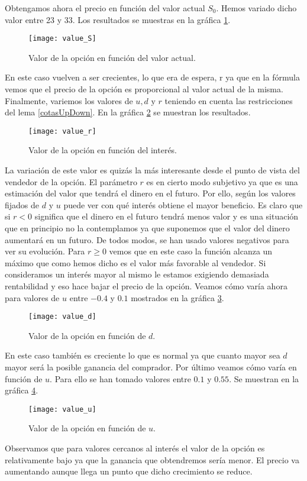 Obtengamos ahora el precio en función del valor actual $ S_0 $. Hemos variado dicho valor entre 23 y 33. Los resultados se muestras en la gráfica \ref{valueS}. 

\begin{figure}[h!]
	\centering
	\texttt{[image: value\_S]}
	\caption{Valor de la opción en función del valor actual.}
	\label{valueS}
\end{figure}
En este caso vuelven a ser crecientes, lo que era de espera, r ya que en la fórmula vemos que el precio de la opción es proporcional al valor actual de la misma. Finalmente, variemos los valores de  $ u, d \text{ y } r$ teniendo en cuenta las restricciones del lema \ref{cotasUpDown}. En la gráfica \ref{valuer} se muestran los resultados.
\begin{figure}[h!]
	\centering
	\texttt{[image: value\_r]}
	\caption{Valor de la opción en función del interés.}
	\label{valuer}
\end{figure}
La variación de este valor es quizás la más interesante desde el punto de vista del vendedor de la opción. El parámetro $ r $ es en cierto modo subjetivo ya que es una estimación del valor que tendrá el dinero en el futuro. Por ello, según los valores fijados de $ d $ y $ u $ puede ver con qué interés obtiene el mayor beneficio. Es claro que si $ r < 0 $ significa que el dinero en el futuro tendrá menos valor y es una situación que en principio no la contemplamos ya que suponemos que el valor del dinero aumentará en un futuro. De todos modos, se han usado valores negativos para ver su evolución. Para $ r \geq 0 $ vemos que en este caso la función alcanza un máximo que como hemos dicho es el valor más favorable al vendedor. Si consideramos un interés mayor al mismo le estamos exigiendo demasiada rentabilidad y eso hace bajar el precio de la opción. Veamos cómo varía ahora para valores de $ u $ entre $ -0.4 $ y $ 0.1 $ mostrados en la gráfica \ref{valued}.
\begin{figure}[h!]
	\centering
	\texttt{[image: value\_d]}
	\caption{Valor de la opción en función de $ d $.}
	\label{valued}
\end{figure}
En este caso también es creciente lo que es normal ya que cuanto mayor sea $ d $ mayor será la posible ganancia del comprador. Por último veamos cómo varía en función de $ u $. Para ello se han tomado valores entre $ 0.1 $ y $ 0.55 $. Se muestran en la gráfica \ref{valueu}.
\begin{figure}[h!]
	\centering
	\texttt{[image: value\_u]}
	\caption{Valor de la opción en función de $ u $.}
	\label{valueu}
\end{figure}

Observamos que para valores cercanos al interés el valor de la opción es relativamente bajo ya que la ganancia que obtendremos sería menor. El precio va aumentando aunque llega un punto que dicho crecimiento se reduce.